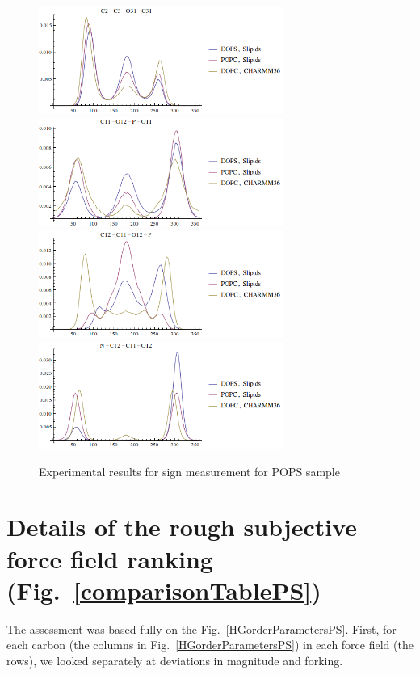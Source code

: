 \documentclass[aps,prl,superscriptaddress,twocolumn]{revtex4}
\begin{document}
\begin{figure}[]
  \includegraphics[width=8.0cm]{../Figs/dihed7.png}
  \includegraphics[width=8.0cm]{../Figs/dihed8.png}
  \includegraphics[width=8.0cm]{../Figs/dihed9.png}
  \includegraphics[width=8.0cm]{../Figs/dihed10.png}
  \caption{\label{dihedrals}
    Experimental results for sign measurement for POPS sample
  }
\end{figure}

\pagebreak
\section{Details of the rough subjective force field ranking (Fig.~\ref{comparisonTablePS})} 

The assessment was based fully on the Fig.~\ref{HGorderParametersPS}.
%
First, for each carbon (the columns in Fig.~\ref{HGorderParametersPS}) in each force field (the rows),
we looked separately at deviations in magnitude and forking.
\end{document}
